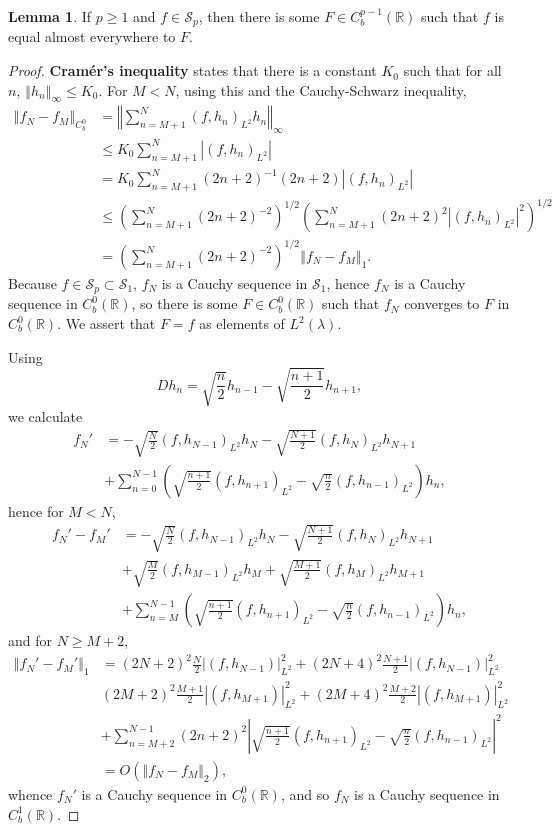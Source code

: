\documentclass{article}
\newcommand{\norm}[1]{\left\Vert #1 \right\Vert}
\theoremstyle{definition}
\newtheorem{lemma}[theorem]{Lemma}
\theoremstyle{definition}
\begin{document}
\begin{lemma}
If $p \geq 1$ and $f \in \mathscr{S}_p$, then there is some $F \in C_b^{p-1}(\mathbb{R})$ such that
$f$ is equal almost everywhere to $F$.
\label{cramer}
\end{lemma}
\begin{proof}
\textbf{Cram\'er's inequality} states that there is a constant $K_0$ such that for all
$n$, $\norm{h_n}_\infty \leq K_0$. 
For $M < N$, using this and the Cauchy-Schwarz inequality,
\begin{align*}
\norm{f_N-f_M}_{C_b^0}&=\norm{ \sum_{n=M+1}^N (f,h_n)_{L^2} h_n}_\infty\\
&\leq K_0 \sum_{n=M+1}^N |(f,h_n)_{L^2}|\\
&= K_0 \sum_{n=M+1}^N (2n+2)^{-1} (2n+2)  |(f,h_n)_{L^2}|\\
&\leq \left( \sum_{n=M+1}^N (2n+2)^{-2}\right)^{1/2} 
\left( \sum_{n=M+1}^N (2n+2)^2   |(f,h_n)_{L^2}|^2 \right)^{1/2}\\
&= \left( \sum_{n=M+1}^N (2n+2)^{-2}\right)^{1/2} \norm{f_N-f_M}_1.
\end{align*}
Because $f \in \mathscr{S}_p \subset \mathscr{S}_1$, $f_N$ is a Cauchy sequence in $\mathscr{S}_1$, hence
$f_N$ is a Cauchy sequence in $C_b^0(\mathbb{R})$, so there is some $F \in C_b^0(\mathbb{R})$ such that
$f_N$ converges to $F$ in $C_b^0(\mathbb{R})$. 
We assert that $F=f$ as elements of $L^2(\lambda)$.

Using
\[
Dh_n= \sqrt{\frac{n}{2}} h_{n-1}-\sqrt{\frac{n+1}{2}} h_{n+1},
\]
we calculate
\begin{align*}
f_N' &= -\sqrt{\frac{N}{2}} (f,h_{N-1})_{L^2} h_N - \sqrt{\frac{N+1}{2}} (f,h_N)_{L^2} h_{N+1}\\
&+\sum_{n=0}^{N-1} \left( \sqrt{\frac{n+1}{2}} (f,h_{n+1})_{L^2}  - \sqrt{\frac{n}{2}} (f,h_{n-1})_{L^2}\right)h_n,
\end{align*}
hence for $M<N$,
\begin{align*}
f_N'-f_M'&= -\sqrt{\frac{N}{2}} (f,h_{N-1})_{L^2} h_N - \sqrt{\frac{N+1}{2}} (f,h_N)_{L^2} h_{N+1}\\
& +\sqrt{\frac{M}{2}} (f,h_{M-1})_{L^2} h_M + \sqrt{\frac{M+1}{2}} (f,h_M)_{L^2} h_{M+1}\\
&+\sum_{n=M}^{N-1} \left( \sqrt{\frac{n+1}{2}} (f,h_{n+1})_{L^2}  - \sqrt{\frac{n}{2}} (f,h_{n-1})_{L^2}\right)h_n,
\end{align*}
and for $N \geq M+2$,
\begin{align*}
\norm{f_N'-f_M'}_{1}&=(2N+2)^2 \frac{N}{2} |(f,h_{N-1})|_{L^2}^2 +(2N+4)^2 \frac{N+1}{2} |(f,h_{N-1})|_{L^2}^2\\
&(2M+2)^2 \frac{M+1}{2} |(f,h_{M+1})|_{L^2}^2+(2M+4)^2 \frac{M+2}{2} |(f,h_{M+1})|_{L^2}^2\\
&+\sum_{n=M+2}^{N-1} (2n+2)^2 \left| \sqrt{\frac{n+1}{2}} (f,h_{n+1})_{L^2}  - \sqrt{\frac{n}{2}} (f,h_{n-1})_{L^2}\right|^2\\
&=O(\norm{f_N-f_M}_2),
\end{align*}
whence
$f_N'$ is a Cauchy sequence in $C_b^0(\mathbb{R})$, and so $f_N$ is a Cauchy sequence in $C_b^1(\mathbb{R})$. 
\end{proof}
\end{document}

